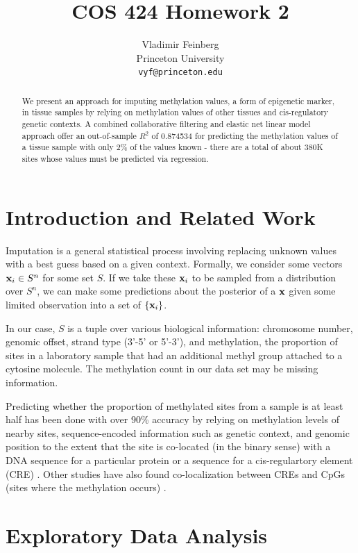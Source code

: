 \documentclass{article} %
\title{COS 424 Homework 2}
\author{
Vladimir Feinberg\\
Princeton University\\
\texttt{vyf@princeton.edu}
}
\begin{document}
\maketitle
\begin{abstract}

We present an approach for imputing methylation values, a form of epigenetic marker, in tissue samples by relying on methylation values of other tissues and cis-regulatory genetic contexts. A combined collaborative filtering and elastic net linear model approach offer an out-of-sample $R^2$ of 0.874534 for predicting the methylation values of a tissue sample with only 2\% of the values known - there are a total of about 380K sites whose values must be predicted via regression.
\end{abstract}

\section{Introduction and Related Work}

Imputation is a general statistical process involving replacing unknown values with a best guess based on a given context. Formally, we consider some vectors $\textbf{x}_i\in S^n$ for some set $S$. If we take these $\textbf{x}_i$ to be sampled from a distribution over $S^n$, we can make some predictions about the posterior of a $\textbf{x}$ given some limited observation into a set of $\{\textbf{x}_i\}$.

In our case, $S$ is a tuple over various biological information: chromosome number, genomic offset, strand type (3'-5' or 5'-3'), and methylation, the proportion of sites in a laboratory sample that had an additional methyl group attached to a cytosine molecule. The methylation count in our data set may be missing information.

Predicting whether the proportion of methylated sites from a sample is at least half has been done with over 90\% accuracy by relying on methylation levels of nearby sites, sequence-encoded information such as genetic context, and genomic position to the extent that the site is co-located (in the binary sense) with a DNA sequence for a particular protein or a sequence for a cis-regulartory element (CRE) \cite{zhang2015predicting}. Other studies have also found co-localization between CREs and CpGs (sites where the methylation occurs) \cite{ziller2013charting}.

\section{Exploratory Data Analysis}
\end{document}
